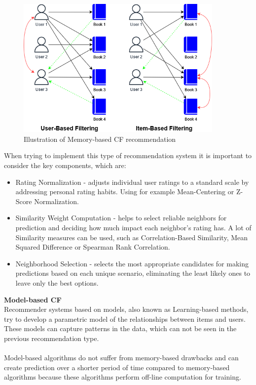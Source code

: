 \documentclass[\myFontSize,oneside,english,hidelinks,a4paper]{article}
\begin{document}
\begin{figure}[h!]
    \centering
    \includegraphics[width=0.9\textwidth]{img/collaborative_example.png}
    \caption{Illustration of Memory-based CF recommendation}
    \label{fig:collaborative_example}
\end{figure}
%
%
When trying to implement this type of recommendation system it is important to consider the key components, which are: 
\begin{itemize}
\item Rating Normalization - adjusts individual user ratings to a standard scale by addressing personal rating habits. Using for example Mean-Centering or Z-Score Normalization. 
\item Similarity Weight Computation - helps to select reliable neighbors for prediction and deciding how much impact each neighbor's rating has. A lot of Similarity measures can be used, such as Correlation-Based Similarity, Mean Squared Difference or Spearman Rank Correlation. 
\item Neighborhood Selection - selects the most appropriate candidates for making predictions based on each unique scenario, eliminating the least likely ones to leave only the best options. \cite{Ning201537}
\end{itemize}
%
%
\textbf{Model-based CF}\\
Recommender systems based on models, also known as Learning-based methods, try to develop a parametric model of the relationships between items and users. These models can capture patterns in the data, which can not be seen in the previous recommendation type. \\\\
Model-based algorithms do not suffer from memory-based drawbacks and can create prediction over a shorter period of time compared to memory-based algorithms because these algorithms perform off-line computation for training. 
\end{document}
